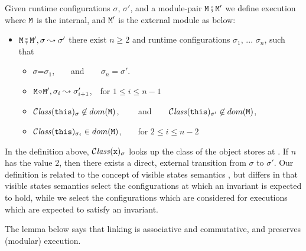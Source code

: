 \begin{definition}
\label{def:execution:internal:external}
\label{def:module_pair_execution} 
Given runtime configurations $\sigma$,  $\sigma'$,  and a module-pair ${\mbox{\tt{\ensuremath{{\mbox{\tt{M}}}}}}} \fatsemi {\mbox{\tt{\ensuremath{{\mbox{\tt{M}}}}}}}'$ we define
execution where ${\mbox{\tt{\ensuremath{{\mbox{\tt{M}}}}}}}$ is the internal, and ${\mbox{\tt{\ensuremath{{\mbox{\tt{M}}}}}}}'$ is the external module as below:
 
\begin{itemize}
\item
${\mbox{\tt{\ensuremath{{\mbox{\tt{M}}}}}}} \fatsemi {\mbox{\tt{\ensuremath{{\mbox{\tt{M}}}}}}}', \sigma \leadsto \sigma'$ \IFF
there exist  $n\geq 2$ and runtime configurations $\sigma_1$,  ...
$\sigma_n$, such that
\begin{itemize}
\item
$\sigma$=$\sigma_1$,\ \  \ \ and\ \ \ \ $\sigma_n=\sigma'$.
\item
${\mbox{\tt{\ensuremath{{\mbox{\tt{M}}}}}}} \!\circ\! {\mbox{\tt{\ensuremath{{\mbox{\tt{M}}}}}}}', \sigma_i \leadsto \sigma_{i+1}'$,\  \  for $1\leq i \leq n\!-\!1$
\item
${\mathcal C}{\mathit{lass}}({\mbox{\tt{this}}})_{\sigma}\not\in dom({{\mbox{\tt{\ensuremath{{\mbox{\tt{M}}}}}}}})$,  \ \  \ \ and\ \ \ \
${\mathcal C}{\mathit{lass}}({\mbox{\tt{this}}})_{\sigma'} \not\in dom({{\mbox{\tt{\ensuremath{{\mbox{\tt{M}}}}}}}})$,
\item
 ${\mathcal C}{\mathit{lass}}({\mbox{\tt{this}}})_{\sigma_i} \in dom({{\mbox{\tt{\ensuremath{{\mbox{\tt{M}}}}}}}})$,\ \ \ \ for $2\leq i \leq n\!-\!2$
\end{itemize}
\end{itemize}

\end{definition}

In the definition above,  ${\mathcal C}{\mathit{lass}}({\mbox{\tt{x}}})_{\sigma} $ looks up the class of the object stores at \x{}.
If  $n$  has the value $2$, %
then  there exists a direct, external transition from $\sigma$ to
$\sigma'$.  Our definition is related to the concept of visible states
semantics \cite{MuellerPoetzsch-HeffterLeavens06}, but differs in that
visible states semantics select the configurations at which an
invariant is expected to hold, while we select the configurations
which are
considered for executions which are expected to satisfy an invariant.


The lemma below says  that linking is associative and commutative, and preserves (modular) execution.


